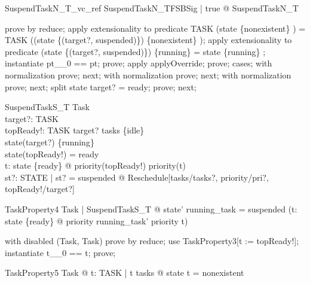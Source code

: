 \documentclass[a4paper, 12pt]{article}
\begin{document}
\begin{theorem}{SuspendTaskN\_T\_vc\_ref}
\forall  SuspendTaskN\_TFSBSig | true @ \pre  SuspendTaskN\_T
\end{theorem}

\begin{zproof}
prove by reduce;
apply extensionality to predicate TASK \setminus  (state \inv  \limg  \{nonexistent\} \rimg ) = TASK \setminus  ((state \oplus  \{(target?, suspended)\}) \inv  \limg  \{nonexistent\} \rimg );
apply extensionality to predicate (state \oplus  \{(target?, suspended)\}) \inv  \limg  \{running\} \rimg  = state \inv  \limg  \{running\} \rimg ;
instantiate pt\_\_0 == pt;
prove;
apply applyOverride;
prove;
cases;
with normalization prove;
next;
with normalization prove;
next;
with normalization prove;
next;
split state target? = ready;
prove;
next;
\end{zproof}

\begin{schema}{SuspendTaskS\_T}
  \Delta Task\\
  target?: TASK\\
  topReady!: TASK
\where
  target? \in  tasks \setminus  \{idle\}\\
  state(target?) \in  \{running\}\\
  state(topReady!) = ready\\
  \forall  t: state \inv  \limg  \{ready\} \rimg  @ priority(topReady!) \geq  priority(t)\\
  \exists  st?: STATE | st? = suspended @ Reschedule[tasks/tasks?, priority/pri?, topReady!/target?]
\end{schema}

\begin{theorem}{TaskProperty4}
\forall  Task | SuspendTaskS\_T @ state' running\_task = suspended \land  (\forall  t: state \inv  \limg  \{ready\} \rimg  @ priority running\_task' \geq  priority t)
\end{theorem}

\begin{zproof}[TaskProperty4]
with disabled (\Delta Task, Task) prove by reduce;
use TaskProperty3[t := topReady!];
instantiate t\_\_0 == t;
prove;
\end{zproof}

\begin{theorem}{TaskProperty5}
\forall  Task @ \forall  t: TASK | t \notin  tasks @ state t = nonexistent
\end{theorem}
\end{document}
